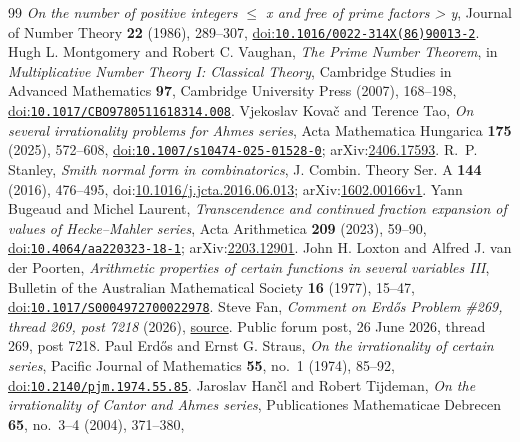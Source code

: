 \documentclass[11pt]{article}
\theoremstyle{remark}
\theoremstyle{plain}
\begin{document}
\begin{thebibliography}{99}
  \emph{On the number of positive integers $\le$ x and free of prime factors > y}, Journal of Number Theory \textbf{22} (1986), 289--307,
  \href{https://doi.org/10.1016/0022-314X(86)90013-2}{doi:\nolinkurl{10.1016/0022-314X(86)90013-2}}.
 Hugh L. Montgomery and Robert C. Vaughan,
  \emph{The Prime Number Theorem}, in \emph{Multiplicative Number Theory I: Classical Theory}, Cambridge Studies in Advanced Mathematics \textbf{97}, Cambridge University Press (2007), 168--198,
  \href{https://doi.org/10.1017/CBO9780511618314.008}{doi:\nolinkurl{10.1017/CBO9780511618314.008}}.
 Vjekoslav Kova\v{c} and Terence Tao,
  \emph{On several irrationality problems for Ahmes series}, Acta Mathematica Hungarica \textbf{175} (2025), 572--608,
  \href{https://doi.org/10.1007/s10474-025-01528-0}{doi:\nolinkurl{10.1007/s10474-025-01528-0}}; arXiv:\href{https://arxiv.org/abs/2406.17593}{2406.17593}.
 R.~P. Stanley, \emph{Smith normal form in combinatorics},
  J. Combin. Theory Ser. A \textbf{144} (2016), 476--495,
  doi:\href{https://doi.org/10.1016/j.jcta.2016.06.013}{10.1016/j.jcta.2016.06.013};
  arXiv:\href{https://arxiv.org/abs/1602.00166v1}{1602.00166v1}.
 Yann Bugeaud and Michel Laurent,
  \emph{Transcendence and continued fraction expansion of values of Hecke--Mahler series}, Acta Arithmetica \textbf{209} (2023), 59--90,
  \href{https://doi.org/10.4064/aa220323-18-1}{doi:\nolinkurl{10.4064/aa220323-18-1}}; arXiv:\href{https://arxiv.org/abs/2203.12901}{2203.12901}.
 John H. Loxton and Alfred J. van der Poorten,
  \emph{Arithmetic properties of certain functions in several variables III}, Bulletin of the Australian Mathematical Society \textbf{16} (1977), 15--47,
  \href{https://doi.org/10.1017/S0004972700022978}{doi:\nolinkurl{10.1017/S0004972700022978}}.
 Steve Fan,
  \emph{Comment on Erd\H{o}s Problem \#269, thread 269, post 7218} (2026),
  \href{https://www.erdosproblems.com/forum/thread/269#post-7218}{source}. Public forum post, 26 June 2026, thread 269, post 7218.
 Paul Erd\H{o}s and Ernst G. Straus,
  \emph{On the irrationality of certain series}, Pacific Journal of Mathematics \textbf{55}, no.~1 (1974), 85--92,
  \href{https://doi.org/10.2140/pjm.1974.55.85}{doi:\nolinkurl{10.2140/pjm.1974.55.85}}.
 Jaroslav Han\v{c}l and Robert Tijdeman,
  \emph{On the irrationality of Cantor and Ahmes series}, Publicationes Mathematicae Debrecen \textbf{65}, no.~3--4 (2004), 371--380,

\end{thebibliography}
\end{document}
